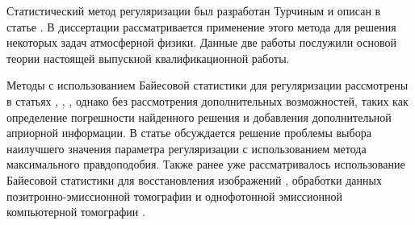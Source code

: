 Статистический метод регуляризации был разработан Турчиным и описан в статье \cite{turchin}. В диссертации \cite{turovceva} рассматривается применение этого метода для решения некоторых задач атмосферной физики. Данные две работы послужили основой теории настоящей выпускной квалификационной работы.


Методы с использованием Байесовой статистики для регуляризации рассмотрены в статьях \cite{review1}, \cite{rev1995}, \cite{rev:emper}, однако без рассмотрения дополнительных возможностей, таких как определение погрешности найденного решения и добавления дополнительной априорной информации. В статье \cite{rev2009} обсуждается решение проблемы выбора наилучшего значения параметра регуляризации с использованием метода максимального правдоподобия. Также ранее уже рассматривалось использование Байесовой статистики для восстановления изображений \cite{rev1972}, обработки данных позитронно-эмиссионной томографии \cite{rev1985a} и однофотонной эмиссионной компьютерной томографии \cite{rev1985b}.